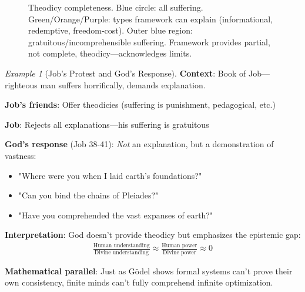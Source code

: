 \documentclass[11pt,a4paper]{article}
\theoremstyle{definition}
\theoremstyle{remark}
\newtheorem{example}{Example}[section]
\begin{document}
\begin{small}
\begin{enumerate}
\begin{figure}[H]
\caption{Theodicy completeness. Blue circle: all suffering. Green/Orange/Purple: types framework can explain (informational, redemptive, freedom-cost). Outer blue region: gratuitous/incomprehensible suffering. Framework provides partial, not complete, theodicy—acknowledges limits.}
\label{fig:theodicy_completeness}
\end{figure}

\begin{example}[Job's Protest and God's Response]
\textbf{Context}: Book of Job—righteous man suffers horrifically, demands explanation.

\textbf{Job's friends}: Offer theodicies (suffering is punishment, pedagogical, etc.)

\textbf{Job}: Rejects all explanations—his suffering is gratuitous

\textbf{God's response} (Job 38-41): \textit{Not} an explanation, but a demonstration of vastness:
\begin{itemize}
    \item "Where were you when I laid earth's foundations?"
    \item "Can you bind the chains of Pleiades?"
    \item "Have you comprehended the vast expanses of earth?"
\end{itemize}

\textbf{Interpretation}: God doesn't provide theodicy but emphasizes the epistemic gap:
\begin{align}
\frac{\text{Human understanding}}{\text{Divine understanding}} \approx \frac{\text{Human power}}{\text{Divine power}} \approx 0
\end{align}

\textbf{Mathematical parallel}: Just as Gödel shows formal systems can't prove their own consistency, finite minds can't fully comprehend infinite optimization.


\end{example}
\end{enumerate}
\end{small}
\end{document}
